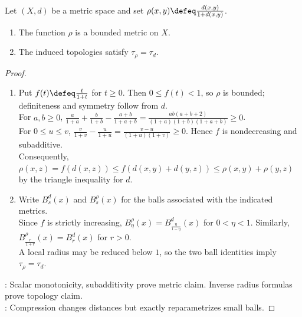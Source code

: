 \begin{proposition} \label{prop:bounded-compression-metric-same-open-sets} \\
Let $(X,d)$ be a metric space and set $\rho(x,y)\defeq\frac{d(x,y)}{1+d(x,y)}$.
\begin{enumerate}[label=(\roman*)]
\setlength{\itemsep}{0pt}
\item The function $\rho$ is a bounded metric on $X$.
\item The induced topologies satisfy $\tau_\rho=\tau_d$.
\end{enumerate}
\begin{proof}
\begin{enumerate}[label=(\roman*)]
\setlength{\itemsep}{0pt}
\item Put $f(t)\defeq\frac{t}{1+t}$ for $t\geq0$. Then $0\leq f(t)<1$, so $\rho$ is bounded; definiteness and symmetry follow from $d$.\\
For $a,b\geq0$, $\frac{a}{1+a}+\frac{b}{1+b}-\frac{a+b}{1+a+b}=\frac{ab(a+b+2)}{(1+a)(1+b)(1+a+b)}\geq0$.\\
For $0\leq u\leq v$, $\frac{v}{1+v}-\frac{u}{1+u}=\frac{v-u}{(1+u)(1+v)}\geq0$. Hence $f$ is nondecreasing and subadditive.\\
Consequently, $\rho(x,z)=f(d(x,z))\leq f(d(x,y)+d(y,z))\leq\rho(x,y)+\rho(y,z)$ by the triangle inequality for $d$.
\item Write $B_s^d(x)$ and $B_s^\rho(x)$ for the balls associated with the indicated metrics.\\
Since $f$ is strictly increasing, $B_\eta^\rho(x)=B_{\frac{\eta}{1-\eta}}^d(x)$ for $0<\eta<1$. Similarly, $B_{\frac{r}{1+r}}^\rho(x)=B_r^d(x)$ for $r>0$.\\
A local radius may be reduced below $1$, so the two ball identities imply $\tau_\rho=\tau_d$.
\end{enumerate}
: Scalar monotonicity, subadditivity prove metric claim. Inverse radius formulas prove topology claim.\\
: Compression changes distances but exactly reparametrizes small balls.
\end{proof}
\end{proposition}

